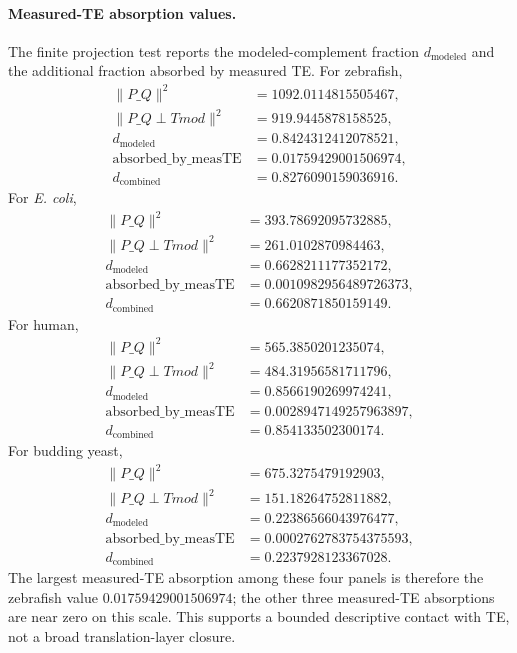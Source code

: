 \paragraph{Measured-TE absorption values.}
The finite projection test reports the modeled-complement fraction $d_{\mathrm{modeled}}$ and the additional fraction absorbed by measured TE.  For zebrafish,
$$
\begin{aligned}
\|P\_Q\|^2 &= 1092.0114815505467,\\
\|P\_{Q\perp Tmod}\|^2 &= 919.9445878158525,\\
d_{\mathrm{modeled}} &= 0.8424312412078521,\\
\mathrm{absorbed\_by\_measTE} &= 0.01759429001506974,\\
d_{\mathrm{combined}} &= 0.8276090159036916.
\end{aligned}
$$
For \emph{E. coli},
$$
\begin{aligned}
\|P\_Q\|^2 &= 393.78692095732885,\\
\|P\_{Q\perp Tmod}\|^2 &= 261.0102870984463,\\
d_{\mathrm{modeled}} &= 0.6628211177352172,\\
\mathrm{absorbed\_by\_measTE} &= 0.0010982956489726373,\\
d_{\mathrm{combined}} &= 0.6620871850159149.
\end{aligned}
$$
For human,
$$
\begin{aligned}
\|P\_Q\|^2 &= 565.3850201235074,\\
\|P\_{Q\perp Tmod}\|^2 &= 484.31956581711796,\\
d_{\mathrm{modeled}} &= 0.8566190269974241,\\
\mathrm{absorbed\_by\_measTE} &= 0.0028947149257963897,\\
d_{\mathrm{combined}} &= 0.854133502300174.
\end{aligned}
$$
For budding yeast,
$$
\begin{aligned}
\|P\_Q\|^2 &= 675.3275479192903,\\
\|P\_{Q\perp Tmod}\|^2 &= 151.18264752811882,\\
d_{\mathrm{modeled}} &= 0.22386566043976477,\\
\mathrm{absorbed\_by\_measTE} &= 0.0002762783754375593,\\
d_{\mathrm{combined}} &= 0.2237928123367028.
\end{aligned}
$$
The largest measured-TE absorption among these four panels is therefore the zebrafish value $0.01759429001506974$; the other three measured-TE absorptions are near zero on this scale.  This supports a bounded descriptive contact with TE, not a broad translation-layer closure.

